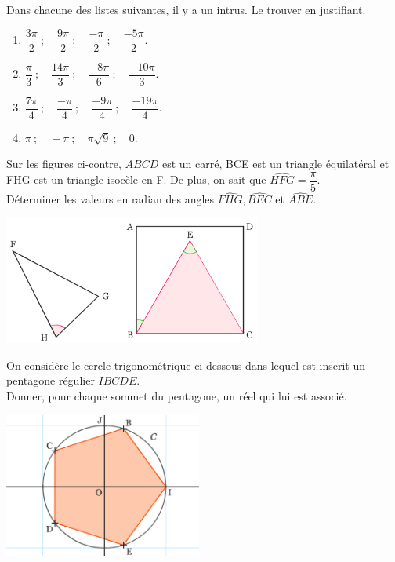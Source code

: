 \documentclass[a4paper,11pt,exos]{nsi} %
\begin{document}
\exo{}
Dans chacune des listes suivantes, il y a un intrus. Le trouver en justifiant.
\begin{multicols}{2}
    \begin{enumerate}
        \item 	$\dfrac{3\pi}{2}\ ; \quad\dfrac{9\pi}{2}\ ;\quad \dfrac{-\pi}{2}\ ;\quad \dfrac{-5\pi}{2}$.
        \item 	$\dfrac{\pi}{3}\ ; \quad\dfrac{14\pi}{3}\ ;\quad \dfrac{-8\pi}{6}\ ;\quad \dfrac{-10\pi}{3}$.
        \item	$\dfrac{7\pi}{4}\ ; \quad\dfrac{-\pi}{4}\ ;\quad \dfrac{-9\pi}{4}\ ;\quad \dfrac{-19\pi}{4}$.
        \item	$\pi\ ;\quad -\pi\ ;\quad \pi\sqrt{9}\ ;\quad 0$.
    \end{enumerate}
    
\end{multicols}



\exo{}
\begin{minipage}{8cm}
	Sur les figures ci-contre, $ABCD$ est un carré, BCE est un triangle équilatéral et FHG est un triangle isocèle en F. De plus, on sait que $\widehat{HFG}=\dfrac{\pi}{5}$.\\[1em]
	Déterminer les valeurs en radian des angles $\widehat{FHG}, \widehat{BEC}$ et $\widehat{ABE}$.
\end{minipage}
\begin{minipage}{9cm}
	\flushright \includegraphics[width=8.5cm]{figure1}
\end{minipage}
\vspace{1cm}


\begin{minipage}{10cm}
	\exo{}
	On considère le cercle trigonométrique ci-dessous dans lequel est inscrit un pentagone régulier $IBCDE$.\\[1em]
	Donner, pour chaque sommet du pentagone, un réel qui lui est associé.
\end{minipage}
\begin{minipage}{7cm}
	\flushright \includegraphics[width=6.5cm]{pentagone}
\end{minipage}
\end{document}
